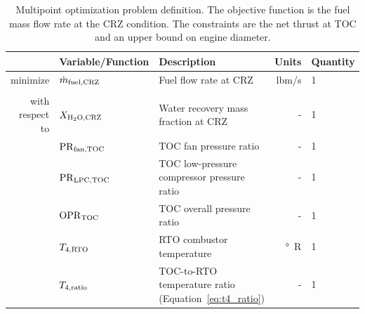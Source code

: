 \documentclass[conf]{new-aiaa}
\begin{document}
\begin{table}[hbt!]
    \centering
    \caption{
        Multipoint optimization problem definition.
        The objective function is the fuel mass flow rate at the CRZ condition.
        The constraints are the net thrust at TOC and an upper bound on engine diameter.
    }
    \small
    \renewcommand{\arraystretch}{1.2}
    \begin{tabular}{r l l r l}
        \toprule
                        & Variable/Function              & Description                                                              & Units            & Quantity \\
        \hline
        minimize        & $\dot{m}_{\rm{fuel,CRZ}} $     & Fuel flow rate at CRZ                                                    & \unit{lbm/s}     & 1        \\
                        &                                &                                                                          &                  &          \\
        with respect to & $X_{\rm{H_2O,CRZ}}$            & Water recovery mass fraction at CRZ                                      & -                & 1        \\
                        & $\rm{PR}_{\rm{fan,TOC}}$       & TOC fan pressure ratio                                                   & -                & 1        \\
                        & $\rm{PR}_{\rm{LPC,TOC}}$       & TOC low-pressure compressor pressure ratio                               & -                & 1        \\
                        & $\rm{OPR}_{\rm{TOC}}$          & TOC overall pressure ratio                                               & -                & 1        \\
                        & $T_{4,\rm{RTO}}$               & RTO combustor temperature                                                & \unit{\degree R} & 1        \\
                        & $T_{4,\rm{ratio}}$             & TOC-to-RTO temperature ratio (Equation~\eqref{eq:t4_ratio})              & -                & 1        \\

\end{tabular}
\end{table}
\end{document}
